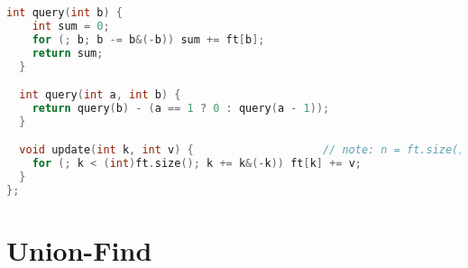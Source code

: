 \documentclass{book}
\begin{document}
{\begin{lstlisting}[language=C]
  int query(int b) {
    int sum = 0;
    for (; b; b -= b&(-b)) sum += ft[b];
    return sum;
  }

  int query(int a, int b) {
    return query(b) - (a == 1 ? 0 : query(a - 1));
  }

  void update(int k, int v) {                    // note: n = ft.size() - 1
    for (; k < (int)ft.size(); k += k&(-k)) ft[k] += v;
  }
};
	\end{lstlisting}
	\section{Union-Find}
	\begin{lstlisting}[language=C]
	
	\end{lstlisting}
	
	
}
\end{document}
